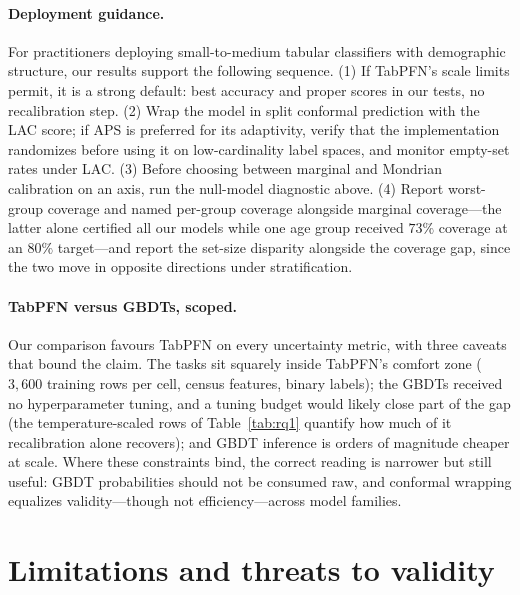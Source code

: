 \documentclass[review,12pt]{elsarticle}
\begin{document}
\paragraph{Deployment guidance.}
For practitioners deploying small-to-medium tabular classifiers with demographic structure, our results support the following sequence. (1) If TabPFN's scale limits permit, it is a strong default: best accuracy and proper scores in our tests, no recalibration step. (2) Wrap the model in split conformal prediction with the LAC score; if APS is preferred for its adaptivity, verify that the implementation randomizes before using it on low-cardinality label spaces, and monitor empty-set rates under LAC. (3) Before choosing between marginal and Mondrian calibration on an axis, run the null-model diagnostic above. (4) Report worst-group coverage and named per-group coverage alongside marginal coverage---the latter alone certified all our models while one age group received $73\%$ coverage at an $80\%$ target---and report the set-size disparity alongside the coverage gap, since the two move in opposite directions under stratification.

\paragraph{TabPFN versus GBDTs, scoped.}
Our comparison favours TabPFN on every uncertainty metric, with three caveats that bound the claim. The tasks sit squarely inside TabPFN's comfort zone ($3{,}600$ training rows per cell, census features, binary labels); the GBDTs received no hyperparameter tuning, and a tuning budget would likely close part of the gap (the temperature-scaled rows of Table~\ref{tab:rq1} quantify how much of it recalibration alone recovers); and GBDT inference is orders of magnitude cheaper at scale. Where these constraints bind, the correct reading is narrower but still useful: GBDT probabilities should not be consumed raw, and conformal wrapping equalizes validity---though not efficiency---across model families.

\section{Limitations and threats to validity}
\label{sec:limitations}
\end{document}
